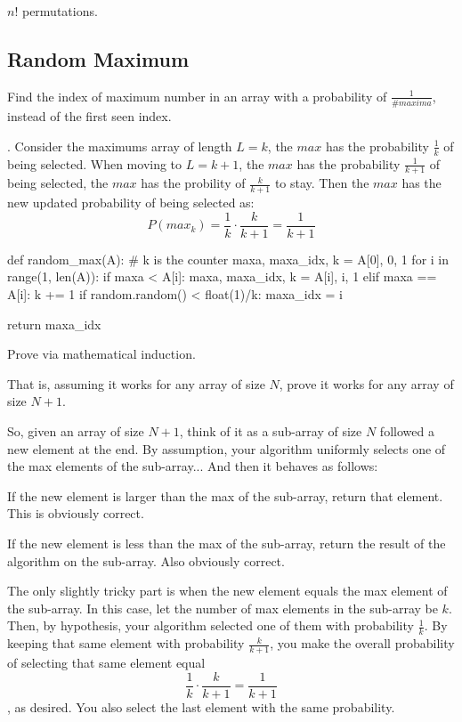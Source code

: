 
$n!$ permutations. 

\subsection{Random Maximum}
Find the index of maximum number in an array with a probability of $\frac{1}{\#maxima}$, instead of the first seen index.

. Consider the maximums array of length $L=k$, the  $max$ has the probability $\frac{1}{k}$ of being selected. When moving to $L=k+1$, the  $max$ has the probability $\frac{1}{k+1}$ of being selected, the  $max$ has the probility of $\frac{k}{k+1}$ to stay. Then the  $max$ has the new updated probability of being selected as:
$$
P(max_k) = \frac{1}{k} \cdot \frac{k}{k+1} = \frac{1}{k+1}
$$
\begin{python}
def random_max(A):
    # k is the counter
    maxa, maxa_idx, k = A[0], 0, 1
    for i in range(1, len(A)):
        if maxa < A[i]:
            maxa, maxa_idx, k = A[i], i, 1
        elif maxa == A[i]:
            k += 1 
            if random.random() < float(1)/k:
                maxa_idx = i

    return maxa_idx

\end{python}


 Prove via mathematical induction. 

That is, assuming it works for any array of size $N$, prove it works for any array of size $N+1$.

So, given an array of size $N+1$, think of it as a sub-array of size $N$ followed a new element at the end. By assumption, your algorithm uniformly selects one of the max elements of the sub-array... And then it behaves as follows:

If the new element is larger than the max of the sub-array, return that element. This is obviously correct.

If the new element is less than the max of the sub-array, return the result of the algorithm on the sub-array. Also obviously correct.

The only slightly tricky part is when the new element equals the max element of the sub-array. In this case, let the number of max elements in the sub-array be $k$. Then, by hypothesis, your algorithm selected one of them with probability $\frac{1}{k}$. By keeping that same element with probability $\frac{k}{k+1}$, you make the overall probability of selecting that same element equal $$\frac{1}{k} \cdot \frac{k}{k+1} = \frac{1}{k+1}$$, as desired. You also select the last element with the same probability.


